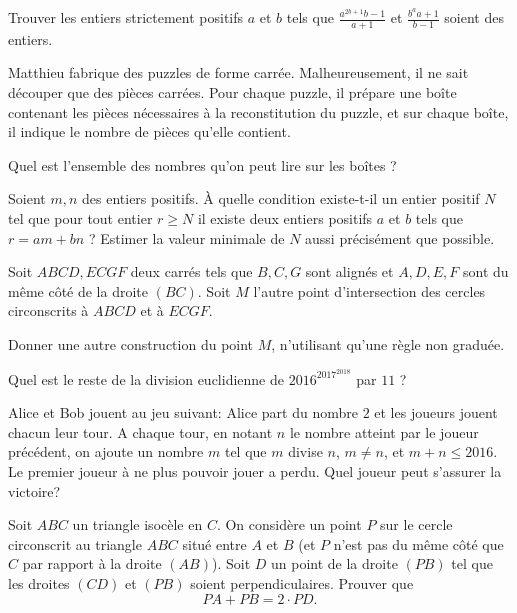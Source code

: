 \begin{exo}{}
Trouver les entiers strictement positifs $a$ et $b$ tels que
$\frac{a^{2b+1} b-1}{a+1}$ et $\frac{b^a a+1}{b-1}$ soient des
entiers.
\end{exo}

\begin{exo}{}
Matthieu fabrique des puzzles de forme carrée. Malheureusement, il ne sait découper que des pièces carrées. Pour chaque puzzle, il prépare une boîte contenant les pièces nécessaires à la reconstitution du puzzle, et sur chaque boîte, il indique le nombre de pièces qu'elle contient.

Quel est l'ensemble des nombres qu'on peut lire sur les boîtes ?
\end{exo}


\begin{exo}{}
Soient $m,n$ des entiers positifs. À quelle condition existe-t-il un entier positif $N$
tel que pour tout entier $r \geq N$ il existe deux entiers positifs $a$ et $b$ tels que  $r=am+bn$ ? Estimer la valeur minimale de $N$ aussi précisément que possible.
\end{exo}

\begin{exo}{}
Soit $ABCD,ECGF$ deux carrés tels que $B,C,G$ sont alignés et $A,D,E,F$ sont
du même côté de la droite $(BC)$. Soit $M$ l'autre point d'intersection des cercles
circonscrits à $ABCD$ et à $ECGF$.

Donner une autre construction du point $M$, n'utilisant qu'une règle non graduée.
\end{exo}

\begin{exo}{}
Quel est le reste de la division euclidienne de $2016^{2017^{2018}}$ par $11$ ?
\end{exo}

\begin{exo}{}
Alice et Bob jouent au jeu suivant:
Alice part du nombre $2$ et les joueurs jouent chacun leur tour. 
A chaque tour, en notant $n$ le nombre atteint par le joueur précédent, on ajoute un nombre $m$ tel que $m$ divise $n$, $m \neq n$, et $m+n \leq 2016$.
Le premier joueur à ne plus pouvoir jouer a perdu.
Quel joueur peut s'assurer la victoire?
\end{exo}

\begin{exo}{}
Soit $ABC$ un triangle isocèle en $C$. On considère un point $P$ sur le cercle circonscrit au triangle $ABC$ situé entre $A$ et $B$ (et $P$ n'est pas du même côté que $C$ par rapport à la droite $(AB)$). Soit $D$ un point de la droite $(PB)$ tel que les droites $(CD)$ et $(PB)$ soient perpendiculaires. Prouver que
\[PA+PB= 2 \cdot PD.\]
\end{exo}


